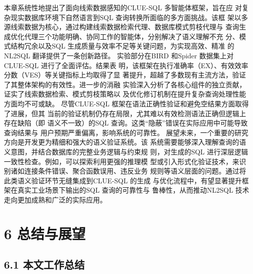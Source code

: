 \documentclass[12pt,a4paper,openright,UTF8]{ctexbook}
\begin{document}
本章系统性地提出了面向线索数据感知的CLUE-SQL 多智能体框架，旨在应 对复杂现实数据库环境下自然语言到SQL 查询转换所面临的多方面挑战。该框 架以多源线索数据为核心，通过构建线索数据检索代理、数据库模式剪枝代理与 查询生成优化代理三个功能明确、协同工作的智能体，分别解决了语义理解不充 分、模式结构冗余以及SQL 生成质量与效率不足等关键问题，为实现高效、精准 的NL2SQL 翻译提供了一条创新路径。 实验部分在BIRD 和Spider 数据集上对CLUE-SQL 进行了全面评估。结果表 明，该框架在执行准确率（EX）、有效效率分数（VES）等关键指标上均取得了显 著提升，超越了多数现有主流方法，验证了其整体架构的有效性。进一步的消融 实验深入分析了各核心组件的独立贡献，证实了线索数据检索、模式剪枝策略以 及优化修订机制在提升复杂查询处理性能方面均不可或缺。 尽管CLUE-SQL 框架在语法正确性验证和避免空结果方面取得了进展，但其 当前的验证机制仍存在局限，尤其难以有效检测语法正确但逻辑上存在缺陷（即 语义不一致）的SQL 查询。这类“隐蔽”错误在实际应用中可能导致查询结果与 用户预期严重偏离，影响系统的可靠性。 展望未来，一个重要的研究方向是开发更为精细和强大的语义验证系统。该 系统需要能够深入理解查询的语义意图，并结合数据库的完整业务逻辑与约束规 则，对生成的SQL 进行深层逻辑一致性检查。例如，可以探索利用更强的推理模 型或引入形式化验证技术，来识别诸如连接条件错误、聚合函数误用、违反业务 规则等语义层面的问题。通过将此类语义验证环节无缝集成到CLUE-SQL 的生成 与优化流程中，有望显著提升框架在真实工业场景下输出的SQL 查询的可靠性与 鲁棒性，从而推动NL2SQL 技术走向更加成熟和广泛的实际应用。

\chapter{6 总结与展望}

\section{6.1 本文工作总结}
\end{document}
